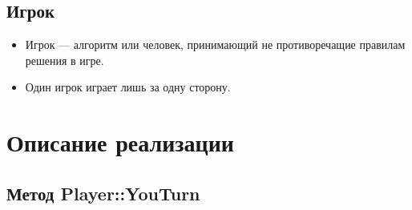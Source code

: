 \documentclass[a4paper,12pt]{article}
\begin{document}
        \subsection{Игрок}
            \begin{itemize}
                \item[] Игрок --- алгоритм или человек, принимающий не противоречащие правилам решения в игре.
                \item[] Один игрок играет лишь за одну сторону.
            \end{itemize}
    
    \section{Описание реализации}
        \subsection{Метод Player::YouTurn}
            



    \newpage
\end{document}

